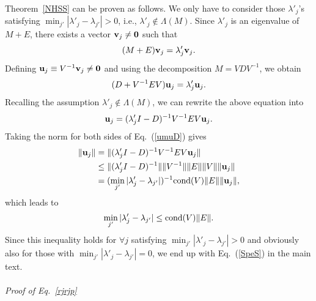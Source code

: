 \documentclass{tADP2e}
\theoremstyle{plain}
\theoremstyle{plain}
\theoremstyle{definition}
\begin{document}
\begin{appendices}
\vspace{3pt}
\noindent
Theorem~\ref{NHSS} can be proven as follows. We only have to consider those $\lambda'_j$'s satisfying $\min_{j'}|\lambda'_j-\lambda_{j'}|>0$, i.e., $\lambda'_j\notin\Lambda(M)$. Since $\lambda'_j$ is an eigenvalue of $M+E$, there exists a vector $\bold{v}_j\neq\bold{0}$ such that 
\begin{equation}
(M+E)\bold{v}_j=\lambda'_j\bold{v}_j.
\end{equation}
Defining $\bold{u}_j\equiv V^{-1}\bold{v}_j\neq\bold{0}$ and using the decomposition $M=VDV^{-1}$, we obtain 
\begin{equation}
(D+V^{-1}EV)\bold{u}_j=\lambda'_j\bold{u}_j.
\end{equation}
Recalling the assumption $\lambda'_j\notin\Lambda(M)$, we can rewrite the above equation into
\begin{equation}
\bold{u}_j=(\lambda'_jI-D)^{-1}V^{-1}EV\bold{u}_j.
\label{umuD}
\end{equation}
Taking the norm for both sides of Eq.~(\ref{umuD}) gives
\begin{equation}
\begin{split}
\|\bold{u}_j\|&=\|(\lambda'_jI-D)^{-1}V^{-1}EV\bold{u}_j\| \\
&\le \|(\lambda'_jI-D)^{-1}\|\|V^{-1}\|\|E\|\|V\|\|\bold{u}_j\| \\
&=(\min_{j'}|\lambda'_j-\lambda_{j'}|)^{-1}{\rm cond}(V)\|E\|\|\bold{u}_j\|,
\end{split}
\end{equation}
which  leads to
\begin{equation}
\min_{j'}|\lambda'_j-\lambda_{j'}|\le {\rm cond}(V)\|E\|.
\end{equation}
Since this inequality holds for $\forall j$ satisfying $\min_{j'}|\lambda'_j-\lambda_{j'}|>0$ and obviously also for those with $\min_{j'}|\lambda'_j-\lambda_{j'}|=0$, we end up with Eq.~(\ref{SpeS}) in the main text. 
\\
\\
{\it Proof of Eq.~\eqref{rjrjp}}


\end{appendices}
\end{document}
